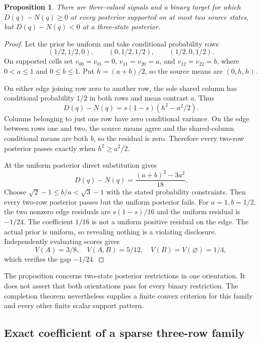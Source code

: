 \documentclass[11pt,a4paper]{article}
\newtheorem{proposition}[theorem]{Proposition}
\begin{document}
\begin{proposition}\label{prop:sparse}
There are three-valued signals and a binary target for which $D(q)-N(q)\geq0$ at every posterior supported on at most two source states, but $D(q)-N(q)<0$ at a three-state posterior.
\end{proposition}
\begin{proof}
Let the prior be uniform and take conditional probability rows
\[
 (1/2,1/2,0),\qquad(0,1/2,1/2),\qquad(1/2,0,1/2).
\]
On supported cells set $v_{00}=v_{01}=0$, $v_{11}=v_{20}=a$, and $v_{12}=v_{22}=b$, where $0<a\leq1$ and $0\leq b\leq1$. Put $h=(a+b)/2$, so the source means are $(0,h,h)$.

On either edge joining row zero to another row, the sole shared column has conditional probability $1/2$ in both rows and mean contrast $a$. Thus
\[
 D(q)-N(q)=s(1-s)(h^2-a^2/2).
\]
Columns belonging to just one row have zero conditional variance. On the edge between rows one and two, the source means agree and the shared-column conditional means are both $b$, so the residual is zero. Therefore every two-row posterior passes exactly when $h^2\geq a^2/2$.

At the uniform posterior direct substitution gives
\[
 D(q)-N(q)=\frac{(a+b)^2-3a^2}{18}.
\]
Choose $\sqrt2-1\leq b/a<\sqrt3-1$ with the stated probability constraints. Then every two-row posterior passes but the uniform posterior fails. For $a=1,b=1/2$, the two nonzero edge residuals are $s(1-s)/16$ and the uniform residual is $-1/24$. The coefficient $1/16$ is not a uniform positive residual on the edge. The actual prior is uniform, so revealing nothing is a violating disclosure. Independently evaluating scores gives
\[
 V(A)=3/8,\quad V(A,B)=5/12,\quad V(B)=V(\varnothing)=1/4,
\]
which verifies the gap $-1/24$.
\end{proof}
The proposition concerns two-state posterior restrictions in one orientation. It does not assert that both orientations pass for every binary restriction. The completion theorem nevertheless supplies a finite convex criterion for this family and every other finite scalar support pattern.

\subsection{Exact coefficient of a sparse three-row family}
\end{document}
